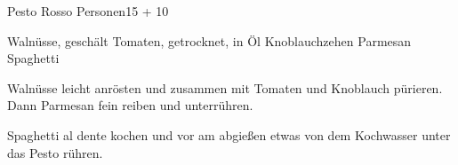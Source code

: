 \begin{MyRecipe}{Pesto Rosso}{ Personen}{\SI{15}{\minuteprime} + \SI{10}{\minuteprime}}
	
	
	\ingredient[\Calc{0.06}{\x}]{\si{\kilogram}} {Walnüsse, geschält}
	\ingredient[\Calc{0.15}{\x}]{\si{\kilogram}} {Tomaten, getrocknet, in Öl}
	\ingredient[\Calc{1}{\x}]{} {Knoblauchzehen}
	\ingredient[\Calc{50}{\x}]{\si{\gram}} {Parmesan}
	\ingredient[\Calc{0.6}{\x}]{\si{\kilogram}} {Spaghetti}

	Walnüsse leicht anrösten und zusammen mit Tomaten und Knoblauch pürieren. Dann Parmesan fein reiben und unterrühren.


	Spaghetti al dente kochen und vor am abgießen etwas von dem Kochwasser unter das Pesto rühren.


	
\end{MyRecipe}